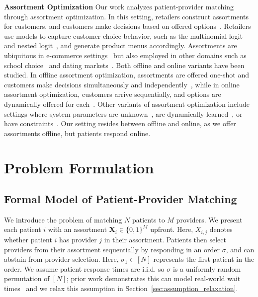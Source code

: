 \documentclass[11pt]{article}
\begin{document}
\textbf{Assortment Optimization} 
Our work analyzes patient-provider matching through assortment optimization. In this setting, retailers construct assortments for customers, and customers make decisions based on offered options~\citep{assortment_optimization}. 
Retailers use models to capture customer choice behavior, such as the multinomial logit~\citep{assortment_mnl} and nested logit~\citep{assortment_nested_logit}, and generate product menus accordingly. 
Assortments are ubiquitous in e-commerce settings~\citep{e_commerce_assortment} but also employed in other domains such as school choice~\citep{assortment_school} and dating markets~\citep{assortment_dating}. Both offline and online variants have been studied. 
In offline assortment optimization, assortments are offered one-shot and customers make decisions simultaneously and independently~\citep{assortment_optimization}, while in online assortment optimization, customers arrive sequentially, and options are dynamically offered for each~\citep{assortment_online}. 
Other variants of assortment optimization include settings where system parameters are unknown~\citep{robust_assortment}, are dynamically learned~\citep{dynamic_assortment}, or have constraints~\citep{assortment_constraint}. 
Our setting resides between offline and online, as we offer assortments offline, but patients respond online. 
\section{Problem Formulation}
\label{sec:problem}

\subsection{Formal Model of Patient-Provider Matching}
\label{sec:model}
We introduce the problem of matching $N$ patients to $M$ providers. 
We present each patient $i$ with an assortment $\mathbf{X}_{i} \in \{0,1\}^{M}$ upfront.
Here, $X_{i,j}$ denotes whether patient $i$ has provider $j$ in their assortment. 
Patients then select providers from their assortment sequentially by responding in an order $\sigma$, and can abstain from provider selection. 
Here, $\sigma_{1} \in [N]$ represents the first patient in the order. 
We assume patient response times are i.i.d. so $\sigma$ is a uniformly random permutation of $[N]$; prior work demonstrates this can model real-world wait times~\citep{queueing_theory} and we relax this assumption in Section~\ref{sec:assumption_relaxation}. 
\end{document}
